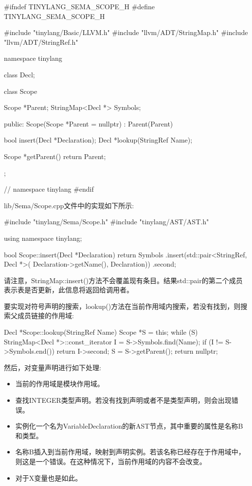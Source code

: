 \begin{cpp}
#ifndef TINYLANG_SEMA_SCOPE_H
#define TINYLANG_SEMA_SCOPE_H

#include "tinylang/Basic/LLVM.h"
#include "llvm/ADT/StringMap.h"
#include "llvm/ADT/StringRef.h"

namespace tinylang {

class Decl;

class Scope {
    Scope *Parent;
    StringMap<Decl *> Symbols;

    public:
    Scope(Scope *Parent = nullptr) : Parent(Parent) {}

    bool insert(Decl *Declaration);
    Decl *lookup(StringRef Name);

    Scope *getParent() { return Parent; }
};
} // namespace tinylang
#endif
\end{cpp}

lib/Sema/Scope.cpp文件中的实现如下所示:

\begin{cpp}
#include "tinylang/Sema/Scope.h"
#include "tinylang/AST/AST.h"

using namespace tinylang;

bool Scope::insert(Decl *Declaration) {
    return Symbols
        .insert(std::pair<StringRef, Decl *>(
            Declaration->getName(), Declaration))
        .second;
}
\end{cpp}

请注意，StringMap::insert()方法不会覆盖现有条目。结果std::pair的第二个成员表示表是否更新，此信息将返回给调用者。

要实现对符号声明的搜索，lookup()方法在当前作用域内搜索，若没有找到，则搜索父成员链接的作用域:

\begin{cpp}
Decl *Scope::lookup(StringRef Name) {
    Scope *S = this;
    while (S) {
        StringMap<Decl *>::const_iterator I =
        S->Symbols.find(Name);
        if (I != S->Symbols.end())
        return I->second;
        S = S->getParent();
    }
    return nullptr;
}
\end{cpp}

然后，对变量声明进行如下处理:

\begin{itemize}
\item
当前的作用域是模块作用域。

\item
查找INTEGER类型声明。若没有找到声明或者不是类型声明，则会出现错误。

\item
实例化一个名为VariableDeclaration的新AST节点，其中重要的属性是名称B和类型。

\item
名称B插入到当前作用域，映射到声明实例。若该名称已经存在于作用域中，则这是一个错误。在这种情况下，当前作用域的内容不会改变。

\item
对于X变量也是如此。
\end{itemize}

